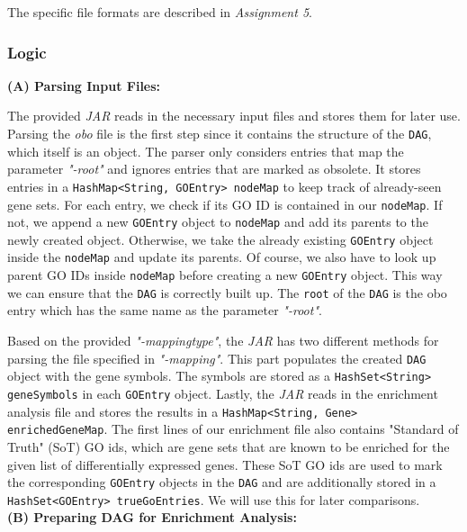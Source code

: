 \documentclass[12pt]{article}
\begin{document}
The specific file formats are described in \textit{Assignment 5}.
\newpage
\subsubsection{Logic}\label{sec:Logic}
\textbf{(A) Parsing Input Files:}

The provided \textit{JAR} reads in the necessary input files and stores them for later use.
Parsing the \textit{obo} file is the first step since it contains the structure
of the \texttt{DAG}, which itself is an object. The parser only considers entries that map
the parameter \textit{"-root"} and ignores entries that are marked as obsolete.
It stores entries in a \texttt{HashMap<String, GOEntry> nodeMap} to keep 
track of already-seen gene sets. For each entry, we check if
its GO ID is contained in our \texttt{nodeMap}. If not, we append
a new \texttt{GOEntry} object to \texttt{nodeMap} and add its parents 
to the newly created object. Otherwise, we take the already existing \texttt{GOEntry} 
object inside the \texttt{nodeMap} and update its parents. 
Of course, we also have to look up parent GO IDs inside \texttt{nodeMap}
before creating a new \texttt{GOEntry} object. This way we can ensure that 
the \texttt{DAG} is correctly built up. The \texttt{root} of the \texttt{DAG} is
the obo entry which has the same name as the parameter \textit{"-root"}.

Based on the provided \textit{"-mappingtype"}, the \textit{JAR} has two different 
methods for parsing the file specified in \textit{"-mapping"}. 
This part populates the created \texttt{DAG} object with the gene symbols.
The symbols are stored as a \texttt{HashSet<String> geneSymbols} in each \texttt{GOEntry} object.
Lastly, the \textit{JAR} reads in the enrichment analysis file and stores the results
in a \texttt{HashMap<String, Gene> enrichedGeneMap}. The first lines of our enrichment file
also contains "Standard of Truth" (SoT) GO ids, which are gene sets that are known to be
enriched for the given list of differentially expressed genes. These SoT GO ids are 
used to mark the corresponding \texttt{GOEntry} objects in the \texttt{DAG} and are
additionally stored in a \texttt{HashSet<GOEntry> trueGoEntries}. We will use this
for later comparisons.\\
\hspace{1mm}
\hspace{1mm}
\textbf{(B) Preparing DAG for Enrichment Analysis:}
\end{document}
